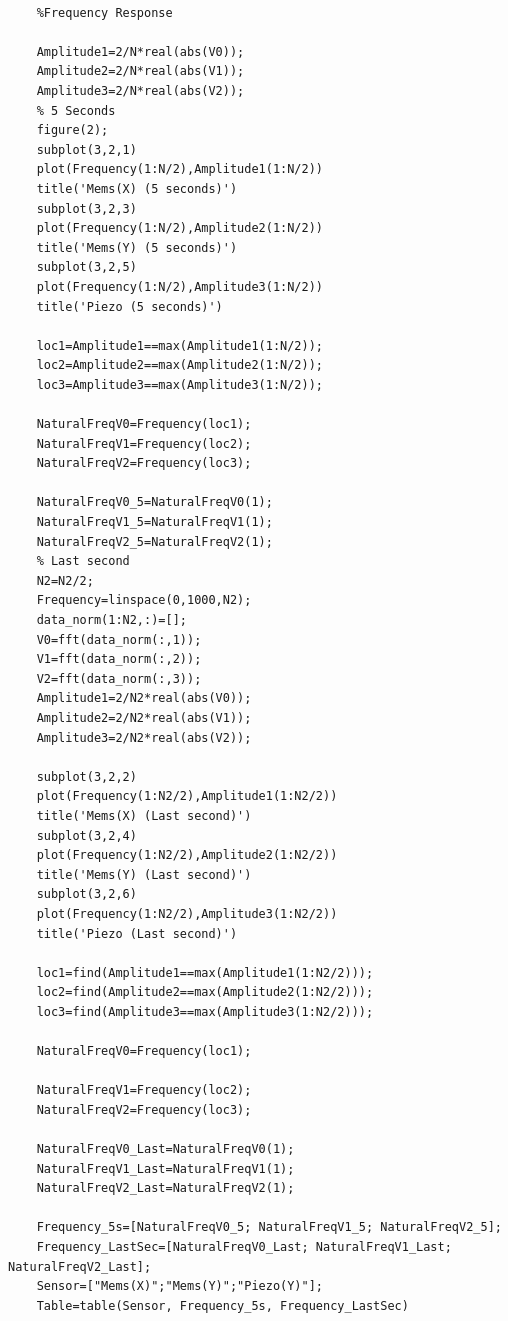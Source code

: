 \documentclass{article}
\begin{document}
\begin{appendices}
\begin{verbatim}
    
    %Frequency Response
    
    Amplitude1=2/N*real(abs(V0));
    Amplitude2=2/N*real(abs(V1));
    Amplitude3=2/N*real(abs(V2));
    % 5 Seconds
    figure(2);
    subplot(3,2,1)
    plot(Frequency(1:N/2),Amplitude1(1:N/2))
    title('Mems(X) (5 seconds)')
    subplot(3,2,3)
    plot(Frequency(1:N/2),Amplitude2(1:N/2))
    title('Mems(Y) (5 seconds)')
    subplot(3,2,5)
    plot(Frequency(1:N/2),Amplitude3(1:N/2))
    title('Piezo (5 seconds)')
    
    loc1=Amplitude1==max(Amplitude1(1:N/2));
    loc2=Amplitude2==max(Amplitude2(1:N/2));
    loc3=Amplitude3==max(Amplitude3(1:N/2));
    
    NaturalFreqV0=Frequency(loc1);
    NaturalFreqV1=Frequency(loc2);
    NaturalFreqV2=Frequency(loc3);
    
    NaturalFreqV0_5=NaturalFreqV0(1);
    NaturalFreqV1_5=NaturalFreqV1(1);
    NaturalFreqV2_5=NaturalFreqV2(1);
    % Last second
    N2=N2/2;
    Frequency=linspace(0,1000,N2);
    data_norm(1:N2,:)=[];
    V0=fft(data_norm(:,1));
    V1=fft(data_norm(:,2));
    V2=fft(data_norm(:,3));
    Amplitude1=2/N2*real(abs(V0));
    Amplitude2=2/N2*real(abs(V1));
    Amplitude3=2/N2*real(abs(V2));
    
    subplot(3,2,2)
    plot(Frequency(1:N2/2),Amplitude1(1:N2/2))
    title('Mems(X) (Last second)')
    subplot(3,2,4)
    plot(Frequency(1:N2/2),Amplitude2(1:N2/2))
    title('Mems(Y) (Last second)')
    subplot(3,2,6)
    plot(Frequency(1:N2/2),Amplitude3(1:N2/2))
    title('Piezo (Last second)')
    
    loc1=find(Amplitude1==max(Amplitude1(1:N2/2)));
    loc2=find(Amplitude2==max(Amplitude2(1:N2/2)));
    loc3=find(Amplitude3==max(Amplitude3(1:N2/2)));
    
    NaturalFreqV0=Frequency(loc1);
    
    NaturalFreqV1=Frequency(loc2);
    NaturalFreqV2=Frequency(loc3);
    
    NaturalFreqV0_Last=NaturalFreqV0(1);
    NaturalFreqV1_Last=NaturalFreqV1(1);
    NaturalFreqV2_Last=NaturalFreqV2(1);
    
    Frequency_5s=[NaturalFreqV0_5; NaturalFreqV1_5; NaturalFreqV2_5];
    Frequency_LastSec=[NaturalFreqV0_Last; NaturalFreqV1_Last; NaturalFreqV2_Last];
    Sensor=["Mems(X)";"Mems(Y)";"Piezo(Y)"];
    Table=table(Sensor, Frequency_5s, Frequency_LastSec)
\end{verbatim}


\end{appendices}
\end{document}
